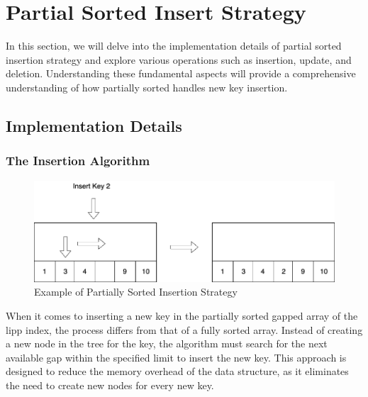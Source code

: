 \chapter{Partial Sorted Insert Strategy}
In this section, we will delve into the implementation details of partial sorted insertion strategy and explore various operations such as insertion, update, and deletion. Understanding these fundamental aspects will provide a comprehensive understanding of how partially sorted handles new key insertion.
\section{Implementation Details}

\subsection{The Insertion Algorithm}




\begin{figure}[H]
    \centering
    \includegraphics[width=120mm,scale=1]{Figures/PartialSortedInsertion.png}
    \caption{
     Example of Partially Sorted Insertion Strategy
    }
    \label{fig:PartialInsertionExample}
\end{figure}

When it comes to inserting a new key in the partially sorted gapped array of the \acrshort{lipp} index, the process differs from that of a fully sorted array. Instead of creating a new node in the tree for the key, the algorithm must search for the next available gap within the specified limit to insert the new key. This approach is designed to reduce the memory overhead of the \learnindex data structure, as it eliminates the need to create new nodes for every new key.

